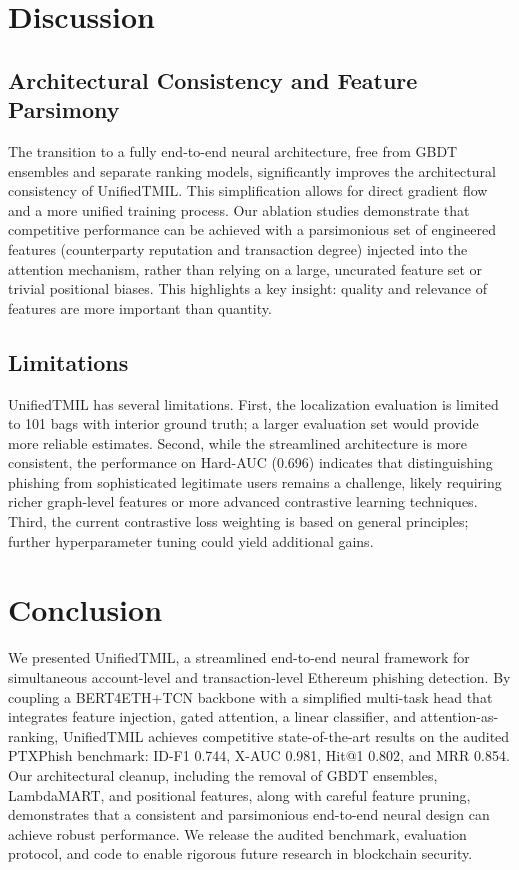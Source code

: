 \documentclass[conference]{IEEEtran}
\begin{document}
\section{Discussion}
\subsection{Architectural Consistency and Feature Parsimony}
The transition to a fully end-to-end neural architecture, free from GBDT ensembles and separate ranking models, significantly improves the architectural consistency of UnifiedTMIL. This simplification allows for direct gradient flow and a more unified training process. Our ablation studies demonstrate that competitive performance can be achieved with a parsimonious set of engineered features (counterparty reputation and transaction degree) injected into the attention mechanism, rather than relying on a large, uncurated feature set or trivial positional biases. This highlights a key insight: quality and relevance of features are more important than quantity.

\subsection{Limitations}
UnifiedTMIL has several limitations. First, the localization evaluation is limited to 101 bags with interior ground truth; a larger evaluation set would provide more reliable estimates. Second, while the streamlined architecture is more consistent, the performance on Hard-AUC (0.696) indicates that distinguishing phishing from sophisticated legitimate users remains a challenge, likely requiring richer graph-level features or more advanced contrastive learning techniques. Third, the current contrastive loss weighting is based on general principles; further hyperparameter tuning could yield additional gains.

\section{Conclusion}
We presented UnifiedTMIL, a streamlined end-to-end neural framework for simultaneous account-level and transaction-level Ethereum phishing detection. By coupling a BERT4ETH+TCN backbone with a simplified multi-task head that integrates feature injection, gated attention, a linear classifier, and attention-as-ranking, UnifiedTMIL achieves competitive state-of-the-art results on the audited PTXPhish benchmark: ID-F1 0.744, X-AUC 0.981, Hit@1 0.802, and MRR 0.854. Our architectural cleanup, including the removal of GBDT ensembles, LambdaMART, and positional features, along with careful feature pruning, demonstrates that a consistent and parsimonious end-to-end neural design can achieve robust performance. We release the audited benchmark, evaluation protocol, and code to enable rigorous future research in blockchain security.
\end{document}
